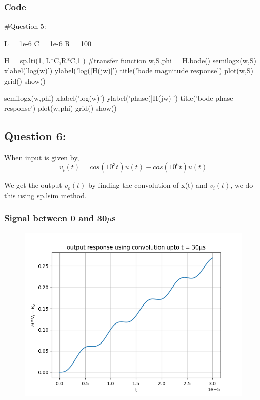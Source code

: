 \documentclass[11pt]{article}
\begin{document}
\subsubsection{Code}
\begin{python}
#Question 5:

L = 1e-6
C = 1e-6
R = 100

H = sp.lti(1,[L*C,R*C,1]) #transfer function
w,S,phi = H.bode()
semilogx(w,S)
xlabel('log(w)')
ylabel('log(|H(jw)|')
title('bode magnitude response')
plot(w,S)
grid()
show()

semilogx(w,phi)
xlabel('log(w)')
ylabel('phase(|H(jw)|')
title('bode phase response')
plot(w,phi)
grid()
show()
\end{python}

\subsection{Question 6:}
When input is given by,
\begin{equation}
    v_i(t) = cos(10^3t)u(t) - cos(10^6t)u(t)
\end{equation}

We get the output $v_o(t)$ by finding the convolution of x(t) and $v_i(t)$,
we do this using sp.lsim method.

\subsubsection{Signal between 0 and 30$\mu$s}
\begin{figure}[H]
    \centering
    \includegraphics[scale = 1]{Figure_13.png}
\end{figure}
\end{document}

